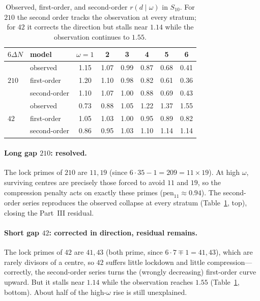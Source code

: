 \documentclass[11pt]{article}
\begin{document}
\begin{table}[h]\centering
\begin{tabular}{llcccccc}
\toprule
$6\Delta N$ & model & $\omega{=}1$ & 2 & 3 & 4 & 5 & 6\\
\midrule
\multirow{3}{*}{$210$}
 & observed     & 1.15 & 1.07 & 0.99 & 0.87 & 0.68 & 0.41\\
 & first-order  & 1.20 & 1.10 & 0.98 & 0.82 & 0.61 & 0.36\\
 & second-order & 1.10 & 1.07 & 1.00 & 0.88 & 0.69 & 0.43\\
\midrule
\multirow{3}{*}{$42$}
 & observed     & 0.73 & 0.88 & 1.05 & 1.22 & 1.37 & 1.55\\
 & first-order  & 1.05 & 1.03 & 1.00 & 0.95 & 0.89 & 0.82\\
 & second-order & 0.86 & 0.95 & 1.03 & 1.10 & 1.14 & 1.14\\
\bottomrule
\end{tabular}
\caption{Observed, first-order, and second-order $r(d\mid\omega)$ in $S_{10}$.
For $210$ the second order tracks the observation at every stratum; for $42$ it
corrects the direction but stalls near $1.14$ while the observation continues to
$1.55$.}
\label{tab:so}
\end{table}

\paragraph{Long gap $210$: resolved.}
The lock primes of $210$ are $11,19$ (since $6\cdot35-1=209=11\times19$). At high
$\omega$, surviving centres are precisely those forced to avoid $11$ and $19$, so
the compression penalty acts on exactly these primes
($\mathrm{pen}_{11}\approx0.94$). The second-order series reproduces the observed
collapse at every stratum (Table~\ref{tab:so}, top), closing the Part~III
residual.

\paragraph{Short gap $42$: corrected in direction, residual remains.}
The lock primes of $42$ are $41,43$ (both prime, since $6\cdot7\mp1=41,43$),
which are rarely divisors of a centre, so $42$ suffers little lockdown and little
compression---correctly, the second-order series turns the (wrongly decreasing)
first-order curve upward. But it stalls near $1.14$ while the observation reaches
$1.55$ (Table~\ref{tab:so}, bottom). About half of the high-$\omega$ rise is
still unexplained.
\end{document}
